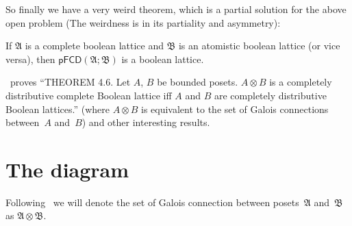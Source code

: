 So finally we have a very weird theorem, which is a partial solution for the
above open problem (The weirdness is in its partiality and asymmetry):

\begin{thm}
  If $\mathfrak{A}$ is a complete boolean lattice and $\mathfrak{B}$ is an
  atomistic boolean lattice (or vice versa), then $\mathsf{pFCD} (\mathfrak{A};
  \mathfrak{B})$ is a boolean lattice.
\end{thm}

\cite{shmuely1974}~proves
``THEOREM 4.6. Let $A$, $B$ be bounded posets. $A \otimes B$ is a completely
distributive complete Boolean lattice iff $A$ and $B$ are completely distributive
Boolean lattices.'' (where $A \otimes B$ is equivalent to the set of Galois connections between~$A$ and~$B$) and other interesting results.

\section{The diagram}

Following~\cite{tprod-dist-lat} we will denote the set of Galois connection between posets~$\mathfrak{A}$ and~$\mathfrak{B}$
as $\mathfrak{A}\otimes\mathfrak{B}$. 

